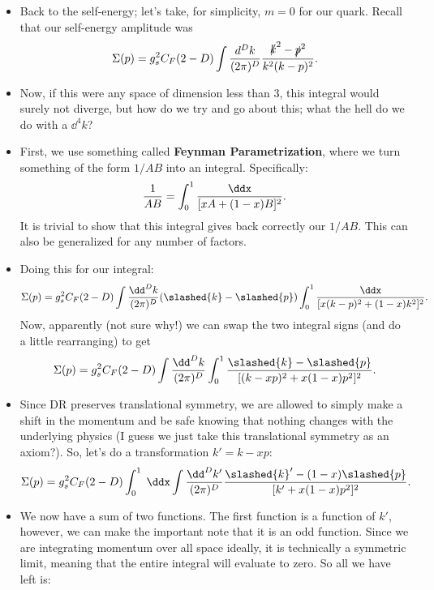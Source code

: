 \begin{itemize}
    \item Back to the self-energy; let's take, for simplicity, $m=0$ for our quark. Recall that our self-energy amplitude was
        \begin{equation*}
            \Sigma(p) = g_s^2 C_F(2-D) \int \frac{d^Dk}{(2\pi)^D} \frac{\slashed{k}^2 - \slashed{p}^2}{k^2(k-p)^2}.
        \end{equation*}
    \item Now, if this were any space of dimension less than 3, this integral would surely not diverge, but how do we try and go about this; what the hell do we do with a $\dd^4k$?
    \item First, we use something called \textbf{Feynman Parametrization}, where we turn something of the form $1/AB$ into an integral. Specifically:
        \begin{equation}
            \frac{1}{AB} = \int_0^1 \frac{\ddx}{[xA + (1-x)B]^2}.
        \end{equation}
        It is trivial to show that this integral gives back correctly our $1/AB$. This can also be generalized for any number of factors.
    \item Doing this for our integral:
        \begin{equation*}
            \Sigma(p) = g_s^2C_F(2-D) \int \frac{\dd^Dk}{(2\pi)^D} (\slashed{k} - \slashed{p}) \int_0^1 \frac{\ddx}{[x(k-p)^2 + (1-x)k^2]^2}.
        \end{equation*}
        Now, apparently (not sure why!) we can swap the two integral signs (and do a little rearranging) to get
        \begin{equation*}
            \Sigma(p) = g_s^2 C_F (2-D) \int \frac{\dd^Dk}{(2\pi)^D} \int_0^1 \frac{\slashed{k} - \slashed{p}}{[(k-xp)^2 + x(1-x)p^2]^2}.
        \end{equation*}
    \item Since DR preserves translational symmetry, we are allowed to simply make a shift in the momentum and be safe knowing that nothing changes with the underlying physics (I guess we just take this translational symmetry as an axiom?). So, let's do a transformation $k' = k-xp$:
        \begin{equation*}
            \Sigma(p) = g_s^2 C_F (2-D) \int_0^1 \;\ddx \int \frac{\dd^Dk'}{(2\pi)^D} \frac{\slashed{k}' - (1-x)\slashed{p}}{[k' + x(1-x)p^2]^2}.
        \end{equation*}
    \item We now have a sum of two functions. The first function is a function of $k'$, however, we can make the important note that it is an odd function. Since we are integrating momentum over all space ideally, it is technically a symmetric limit, meaning that the entire integral will evaluate to zero. So all we have left is:

\end{itemize}
